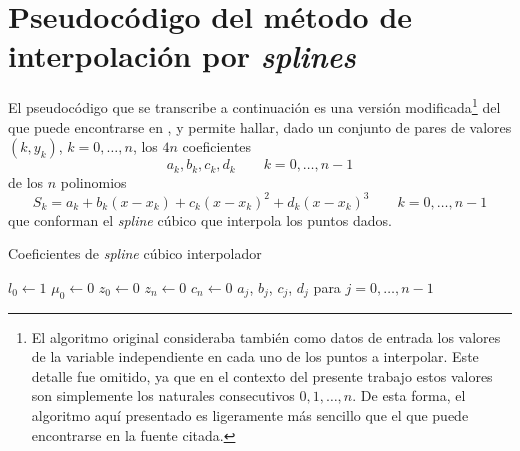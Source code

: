 \section{Pseudocódigo del método de interpolación por \emph{splines}}

    El pseudocódigo que se transcribe a continuación es una versión modificada\footnote{El algoritmo original consideraba también como datos de entrada los valores de la variable independiente en cada uno de los puntos a interpolar. Este detalle fue omitido, ya que en el contexto del presente trabajo estos valores son simplemente los naturales consecutivos $0, 1, \dots, n$. De esta forma, el algoritmo aquí presentado es ligeramente más sencillo que el que puede encontrarse en la fuente citada.} del que puede encontrarse en \cite[Algoritmo 3.4]{Burden}, y permite hallar, dado un conjunto de pares de valores $(k, y_k)$, $k = 0, \dots, n$, los $4n$ coeficientes
    \[ a_k, b_k, c_k, d_k \qquad k = 0, \dots, n-1 \]
    de los $n$ polinomios
    \[ S_k = a_k + b_k (x - x_k) + c_k (x - x_k)^2 + d_k (x - x_k)^3 \qquad k = 0, \dots, n-1 \]
    que conforman el \emph{spline} cúbico que interpola los puntos dados.


    \begin{algorithm}
      \caption{Coeficientes de \emph{spline} cúbico interpolador}
      \vspace{0.5em} 
      \vspace{0.5em} 
      \vspace{0.5em}
      $l_0 \gets 1$ \;
      $\mu_0 \gets 0$ \;
      $z_0 \gets 0$ \;
      $z_n \gets 0$ \;
      $c_n \gets 0$ \;
      \Return $a_j$, $b_j$, $c_j$, $d_j$ para $j = 0, \dots, n-1$ \;
      \vspace{0.5em}
    \end{algorithm}

